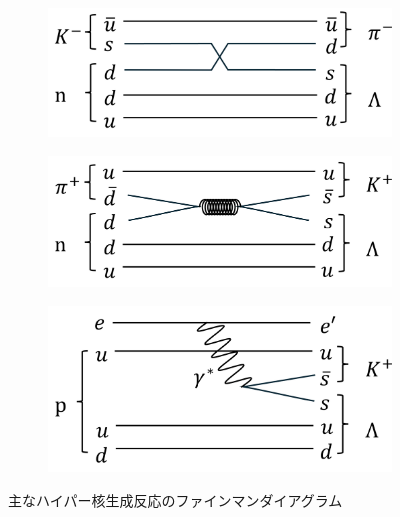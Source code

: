 \documentclass[a4paper,11pt,uplatex]{jsbook}
\begin{document}
\begin{figure}[b]
  \centering
  \begin{subfigure}[b]{0.47\linewidth}
    \centering
    \includegraphics[width=\linewidth]{image/1-Kpi.png}
  \end{subfigure}
  \hfill
  \begin{subfigure}[b]{0.47\linewidth}
    \centering
    \includegraphics[width=\linewidth]{image/1-piK.png}
  \end{subfigure}
  \begin{subfigure}[b]{0.5\linewidth}
    \centering
    \includegraphics[width=\linewidth]{image/1-eeK.png}
  \end{subfigure}
  \caption[主なハイパー核生成反応のファインマンダイアグラム]{主なハイパー核生成反応のファインマンダイアグラム}
\end{figure}
\end{document}
